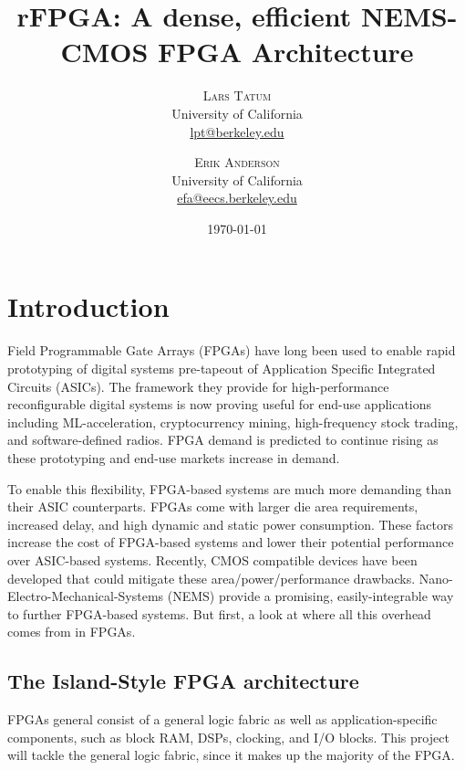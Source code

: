 \documentclass[twoside,twocolumn]{article}
\title{rFPGA: A dense, efficient NEMS-CMOS FPGA Architecture} %
\author{%
\textsc{Lars Tatum}\\[1ex] %
\normalsize University of California \\ %
\normalsize \href{mailto:lpt@berkeley.edu}{lpt@berkeley.edu} %
\and %
\textsc{Erik Anderson}\\[1ex] %
\normalsize University of California \\ %
\normalsize \href{mailto:efa@eecs.berkeley.edu}{efa@eecs.berkeley.edu} %
}
\date{\today} %
\begin{document}
\maketitle


\section{Introduction}

Field Programmable Gate Arrays (FPGAs) have long been used to enable rapid prototyping of digital systems pre-tapeout of Application Specific Integrated Circuits (ASICs)\cite{8187326}. The framework they provide for high-performance reconfigurable digital systems is now proving useful for end-use applications including ML-acceleration, cryptocurrency mining, high-frequency stock trading, and software-defined radios. FPGA demand is predicted to continue rising as these prototyping and end-use markets increase in demand.

To enable this flexibility, FPGA-based systems are much more demanding than their ASIC counterparts. FPGAs come with larger die area requirements, increased delay, and high dynamic and static power consumption. These factors increase the cost of FPGA-based systems and lower their potential performance over ASIC-based systems. Recently, CMOS compatible devices have been developed that could mitigate these area/power/performance drawbacks.  Nano-Electro-Mechanical-Systems (NEMS) provide a promising, easily-integrable way to further FPGA-based systems. But first, a look at where all this overhead comes from in FPGAs.

\subsection{The Island-Style FPGA architecture}

FPGAs general consist of a general logic fabric as well as application-specific components, such as block RAM, DSPs, clocking, and I/O blocks\cite{8187326}. This project will tackle the general logic fabric, since it makes up the majority of the FPGA.
\end{document}
